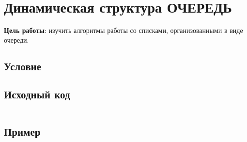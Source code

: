 
\usepackage{minted}





\section{Динамическая структура ОЧЕРЕДЬ}

\textbf{Цель работы}: изучить алгоритмы работы со списками, организованными в виде очереди.

\subsection{Условие}



\subsection{Исходный код}
\inputminted[fontsize=\footnotesize]{c}{../task.c}

\subsection{Пример}
\inputminted[fontsize=\footnotesize]{text}{examples/example.txt}


